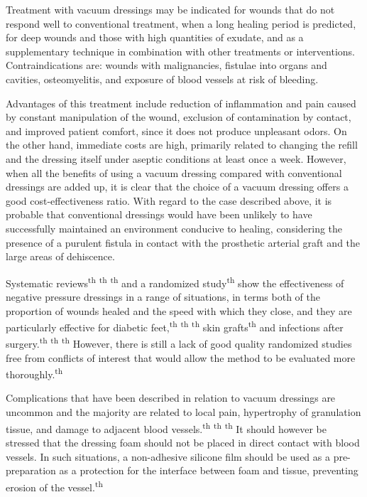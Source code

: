 \documentclass[numberinsection,times,10pt,spreadimages]{memoir}
\begin{document}
Treatment with vacuum dressings may be indicated for wounds that do not respond
well to conventional treatment, when a long healing period is predicted, for
deep wounds and those with high quantities of exudate, and as a supplementary
technique in combination with other treatments or interventions.
Contraindications are: wounds with malignancies, fistulae into organs and
cavities, osteomyelitis, and exposure of blood vessels at risk of bleeding.

Advantages of this treatment include reduction of inflammation and pain caused
by
constant manipulation of the wound, exclusion of contamination by contact, and
improved patient comfort, since it does not produce unpleasant odors. On the
other hand, immediate costs are high, primarily related to changing the refill
and the dressing itself under aseptic conditions at least once a week. However,
when all the benefits of using a vacuum dressing compared with conventional
dressings are added up, it is clear that the choice of a vacuum dressing offers
a good cost-effectiveness ratio. With regard to the case described above, it is
probable that conventional dressings would have been unlikely to have
successfully maintained an environment conducive to healing, considering the
presence of a purulent fistula in contact with the prosthetic arterial graft and
the large areas of dehiscence.

Systematic reviews\textsuperscript{th}
\textsuperscript{th}
\textsuperscript{th}
and a randomized study\textsuperscript{th}
show the effectiveness of negative pressure
dressings in a range of situations, in terms both of the proportion of wounds
healed and the speed with which they close, and they are particularly effective
for diabetic feet,\textsuperscript{th}
\textsuperscript{th}
\textsuperscript{th}
skin grafts\textsuperscript{th}
and infections after surgery.\textsuperscript{th}
\textsuperscript{th}
\textsuperscript{th}
However, there is still a lack of good quality
randomized studies free from conflicts of interest that would allow the method
to be evaluated more thoroughly.\textsuperscript{th}

Complications that have been described in relation to vacuum dressings are
uncommon and the majority are related to local pain, hypertrophy of granulation
tissue, and damage to adjacent blood vessels.\textsuperscript{th}
\textsuperscript{th}
\textsuperscript{th}
It should however be stressed that the dressing
foam should not be placed in direct contact with blood vessels. In such
situations, a non-adhesive silicone film should be used as a pre-preparation as
a protection for the interface between foam and tissue, preventing erosion of
the vessel.\textsuperscript{th}
\end{document}
